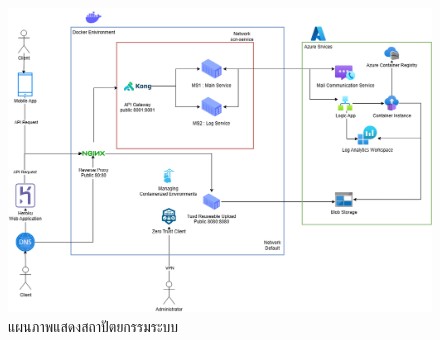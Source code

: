 \begin{landscape}
\begin{figure}[p]
    \centering
    \includegraphics[height=0.9\textheight, keepaspectratio]{resources/system/sys-scn.png}
    \caption[System Architecture]{แผนภาพแสดงสถาปัตยกรรมระบบ}
    \label{fig:system-architecture}
\end{figure}
\end{landscape}
